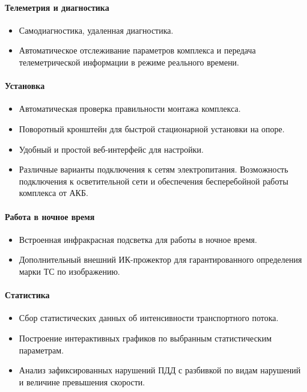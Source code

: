 \documentclass[specification,annotation,times]{itmo-student-thesis}
\begin{document}
\paragraph{Телеметрия и диагностика}
\begin{itemize}
	\item Самодиагностика, удаленная диагностика.
	\item Автоматическое отслеживание параметров комплекса и передача телеметрической информации в режиме реального времени.
\end{itemize}

\paragraph{Установка}
\begin{itemize}
	\item Автоматическая проверка правильности монтажа комплекса.
	\item Поворотный кронштейн для быстрой стационарной установки на опоре.
	\item Удобный и простой веб-интерфейс для настройки.
	\item Различные варианты подключения к сетям электропитания. Возможность подключения к осветительной сети и обеспечения бесперебойной работы комплекса от АКБ.
\end{itemize}

\paragraph{Работа в ночное время}
\begin{itemize}
	\item Встроенная инфракрасная подсветка для работы в ночное время.
	\item Дополнительный внешний ИК-прожектор для гарантированного определения марки ТС по изображению.
\end{itemize}

\paragraph{Статистика}
\begin{itemize}
	\item Сбор статистических данных об интенсивности транспортного потока.
	\item Построение интерактивных графиков по выбранным статистическим параметрам.
	\item Анализ зафиксированных нарушений ПДД с разбивкой по видам нарушений и величине превышения скорости.
\end{itemize}
\end{document}
